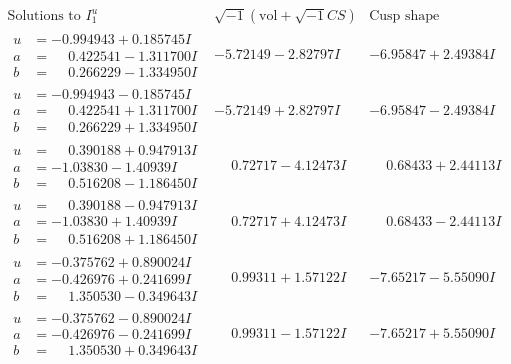 \documentclass[1p]{elsarticle_modified}
\theoremstyle{definition}
\newcommand{\I}{\sqrt{-1}}
\begin{document}
$$\begin{array}{c|c|c}  
\text{Solutions to }I^u_{1}& \I (\text{vol} + \sqrt{-1}CS) & \text{Cusp shape}\\
 \hline 
\begin{aligned}
u &= -0.994943 + 0.185745 I \\
a &= \phantom{-}0.422541 - 1.311700 I \\
b &= \phantom{-}0.266229 - 1.334950 I\end{aligned}
 & -5.72149 - 2.82797 I & -6.95847 + 2.49384 I \\ \hline\begin{aligned}
u &= -0.994943 - 0.185745 I \\
a &= \phantom{-}0.422541 + 1.311700 I \\
b &= \phantom{-}0.266229 + 1.334950 I\end{aligned}
 & -5.72149 + 2.82797 I & -6.95847 - 2.49384 I \\ \hline\begin{aligned}
u &= \phantom{-}0.390188 + 0.947913 I \\
a &= -1.03830 - 1.40939 I \\
b &= \phantom{-}0.516208 - 1.186450 I\end{aligned}
 & \phantom{-}0.72717 - 4.12473 I & \phantom{-}0.68433 + 2.44113 I \\ \hline\begin{aligned}
u &= \phantom{-}0.390188 - 0.947913 I \\
a &= -1.03830 + 1.40939 I \\
b &= \phantom{-}0.516208 + 1.186450 I\end{aligned}
 & \phantom{-}0.72717 + 4.12473 I & \phantom{-}0.68433 - 2.44113 I \\ \hline\begin{aligned}
u &= -0.375762 + 0.890024 I \\
a &= -0.426976 + 0.241699 I \\
b &= \phantom{-}1.350530 - 0.349643 I\end{aligned}
 & \phantom{-}0.99311 + 1.57122 I & -7.65217 - 5.55090 I \\ \hline\begin{aligned}
u &= -0.375762 - 0.890024 I \\
a &= -0.426976 - 0.241699 I \\
b &= \phantom{-}1.350530 + 0.349643 I\end{aligned}
 & \phantom{-}0.99311 - 1.57122 I & -7.65217 + 5.55090 I \\ \hline\begin{aligned}

\end{aligned}
\end{array}$$
\end{document}
